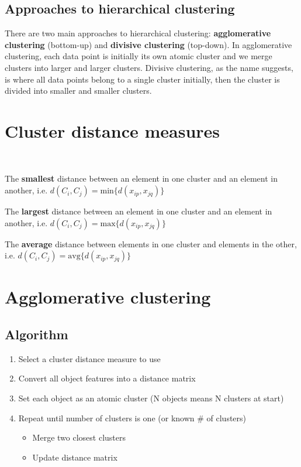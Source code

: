 \documentclass[11pt,fleqn]{book} %
\begin{document}
\subsection*{Approaches to hierarchical clustering}
There are two main approaches to hierarchical clustering: \textbf{agglomerative clustering} (bottom-up) and \textbf{divisive clustering} (top-down). In agglomerative clustering, each data point is initially its own atomic cluster and we merge clusters into larger and larger clusters. Divisive clustering, as the name suggests, is where all data points belong to a single cluster initially, then the cluster is divided into smaller and smaller clusters.

\section{Cluster distance measures}
\
\begin{definition}[Single link]
	The \textbf{smallest} distance between an element in one cluster and an element in another, i.e. $d(C_i, C_j) = \text{min}\{d(x_{ip}, x_{jq})\}$
\end{definition}

\begin{definition}[Complete link]
	The \textbf{largest} distance between an element in one cluster and an element in another, i.e. $d(C_i, C_j) = \text{max}\{d(x_{ip}, x_{jq})\}$
\end{definition}

\begin{definition}[Average]
	The \textbf{average} distance between elements in one cluster and elements in the other, i.e. $d(C_i, C_j) = \text{avg}\{d(x_{ip}, x_{jq})\}$
\end{definition}

\newpage
\section{Agglomerative clustering}
\subsection*{Algorithm}
\begin{enumerate}
	\item Select a cluster distance measure to use
	\item Convert all object features into a distance matrix
	\item Set each object as an atomic cluster (N objects means N clusters at start)
	\item Repeat until number of clusters is one (or known \# of clusters)
	\begin{itemize}
		\item Merge two closest clusters
		\item Update distance matrix
	\end{itemize}
\end{enumerate}
\end{document}
